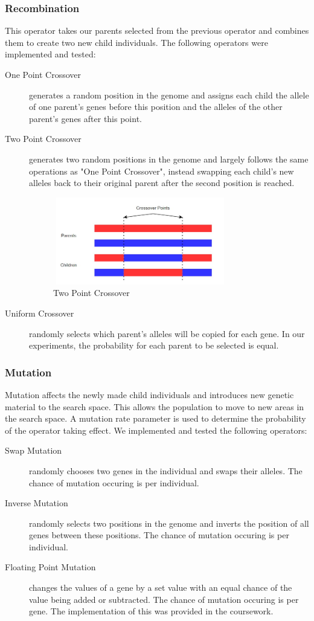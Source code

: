 \documentclass[sigconf]{acmart}
\begin{document}
\subsubsection{Recombination}
This operator takes our parents selected from the previous operator and combines them to create two new child individuals. The following operators were implemented and tested:
\begin{description}
\item[One Point Crossover] generates a random position in the genome and assigns each child the allele of one parent's genes before this position and the alleles of the other parent's genes after this point. \cite{Belfiore1998}
\item[Two Point Crossover] generates two random positions in the genome and largely follows the same operations as "One Point Crossover", instead swapping each child's new alleles back to their original parent after the second position is reached.\cite{Belfiore1998}
\begin{figure}[!htb]
\includegraphics[height=1.5in,width=3in]{2Point}
\caption{Two Point Crossover}
\label{fig:2Point}
\end{figure}
\item[Uniform Crossover] randomly selects which parent's alleles will be copied for each gene. In our experiments, the probability for each parent to be selected is equal. \cite{Belfiore1998}
\end{description}


\subsubsection{Mutation}
Mutation affects the newly made child individuals and introduces new genetic material to the search space. This allows the population to move to new areas in the search space. A mutation rate parameter is used to determine the probability of the operator taking effect.  We implemented and tested the following operators:
\begin{description}
\item[Swap Mutation] randomly chooses two genes in the individual and swaps their alleles. The chance of mutation occuring is per individual.\cite{Mutation}
\item[Inverse Mutation] randomly selects two positions in the genome and inverts the position of all genes between these positions. The chance of mutation occuring is per individual. \cite{Mutation}
\item[Floating Point Mutation] changes the values of a gene by a set value with an equal chance of the value being added or subtracted. The chance of mutation occuring is per gene. The implementation of this was provided in the coursework.
\end{description}
\end{document}
